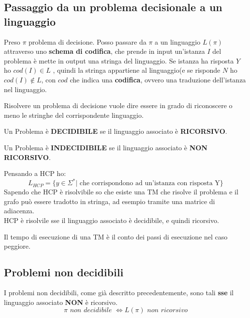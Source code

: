 \subsection{Passaggio da un problema decisionale a un linguaggio}
\begin{definizione}
  Preso $\pi$ problema di decisione. Posso passare da $\pi$ a un linguaggio
  $L(\pi)$ attraverso uno \textbf{schema di codifica}, che prende in input
  un'istanza $I$ del problema è mette in output una stringa del linguaggio. Se
  istanza ha risposta $Y$ ho $cod(I)\in L$ , quindi la stringa appartiene al linguaggio(e se risponde $N$ ho $cod(I)\not\in
  L$, con $cod$ che indica una 
  \textbf{codifica}, ovvero una traduzione dell'istanza nel linguaggio.\\
\end{definizione}
Risolvere un problema di decisione vuole dire essere in grado di riconoscere o meno le stringhe del corrispondente linguaggio.
\begin{definizione}
  Un Problema è \textbf{DECIDIBILE} se il linguaggio associato è \textbf{RICORSIVO}. 
\end{definizione}
\begin{definizione}
  Un Problema è \textbf{INDECIDIBILE} se il linguaggio associato è \textbf{NON RICORSIVO}. 
\end{definizione}
\begin{esempio}
  Pensando a HCP ho:
  \[L_{HCP}=\{y\in \Sigma^*|\mbox{ che corrispondono ad un'istanza con risposta
      Y}\}\]
  Sapendo che HCP è risolvibile so che esiste una TM che risolve il problema e
  il grafo può essere tradotto in stringa, ad esempio tramite una matrice di
  adiacenza.\\
  HCP è risolvile sse il linguaggio associato è decidibile, e quindi ricorsivo.
\end{esempio}
\begin{definizione}
  Il tempo di esecuzione di una TM è il conto dei passi di esecuzione nel caso
  peggiore.
\end{definizione}
\newpage
\subsection{Problemi non decidibili}
I problemi non decidibili, come già descritto precedentemente, sono tali \textbf{sse} il linguaggio associato \textbf{NON} è ricorsivo.
\[\pi \,\, non\,\,decidibile\,\, \iff L(\pi)\,\,non \,\,ricorsivo\]
